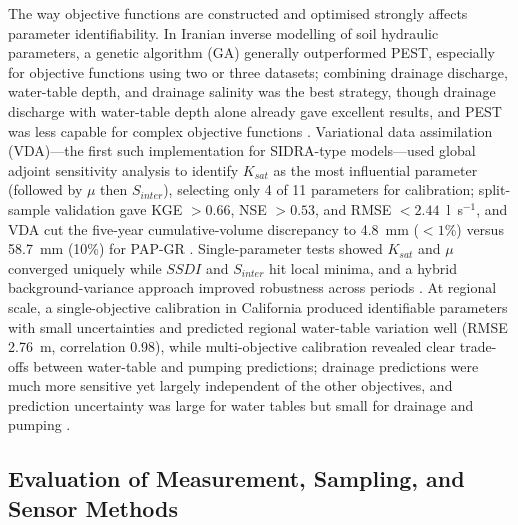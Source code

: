 \documentclass[11pt]{article}
\begin{document}
The way objective functions are constructed and optimised strongly affects
parameter identifiability. In Iranian inverse modelling of soil hydraulic
parameters, a genetic algorithm (GA) generally outperformed PEST, especially for
objective functions using two or three datasets; combining drainage discharge,
water-table depth, and drainage salinity was the best strategy, though drainage
discharge with water-table depth alone already gave excellent results, and PEST
was less capable for complex objective functions \parencite{Sedaghatdoost2019}.
Variational data assimilation (VDA)---the first such implementation for
SIDRA-type models---used global adjoint sensitivity analysis to identify
$K_{sat}$ as the most influential parameter (followed by $\mu$ then $S_{inter}$),
selecting only 4 of 11 parameters for calibration; split-sample validation gave
KGE $>0.66$, NSE $>0.53$, and RMSE $<2.44$~l~s$^{-1}$, and VDA cut the five-year
cumulative-volume discrepancy to 4.8~mm ($<1$\%) versus 58.7~mm (10\%) for
PAP-GR \parencite{Chelil2022b}. Single-parameter tests showed $K_{sat}$ and
$\mu$ converged uniquely while $SSDI$ and $S_{inter}$ hit local minima, and a
hybrid background-variance approach improved robustness across periods
\parencite{Chelil2022b}. At regional scale, a single-objective calibration in
California produced identifiable parameters with small uncertainties and
predicted regional water-table variation well (RMSE 2.76~m, correlation 0.98),
while multi-objective calibration revealed clear trade-offs between water-table
and pumping predictions; drainage predictions were much more sensitive yet
largely independent of the other objectives, and prediction uncertainty was
large for water tables but small for drainage and pumping \parencite{Schoups2005}.

\subsection{Evaluation of Measurement, Sampling, and Sensor Methods}
\end{document}
